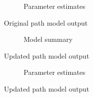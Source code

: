 \documentclass[11pt,a4paper]{article}
\begin{document}
\begin{figure}[htbp]\ContinuedFloat
\begin{subfigure}{\textwidth}

\caption{Parameter estimates}
\end{subfigure}
\caption{Original path model output}
\end{figure}

\begin{figure}[htbp]
\begin{subfigure}{\textwidth}
\small{}
\caption{Model summary}
\end{subfigure}
\caption{Updated path model output}
\label{fig:updated_model_output}
\end{figure}

\begin{figure}[htbp]\ContinuedFloat
\begin{subfigure}{\textwidth}

\caption{Parameter estimates}
\end{subfigure}
\caption{Updated path model output}
\end{figure}


\restoregeometry{}
\end{document}

